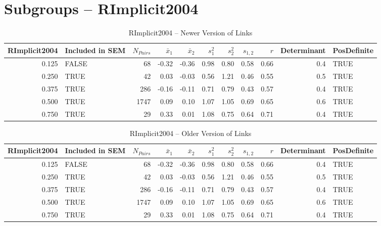 \documentclass{article}\usepackage[]{graphicx}\usepackage[]{color}
\begin{document}
\section{Subgroups --  RImplicit2004 }%
\begin{table}[ht]
\centering
\begin{tabular}{rlrrrrrrrrl}
  \hline
RImplicit2004 & Included in SEM & $N_{Pairs}$ & $\bar{x}_1$ & $\bar{x}_2$ & $s_1^2$ & $s_2^2$ & $s_{1,2}$ & $r$ & Determinant & PosDefinite \\ 
  \hline
0.125 & FALSE & 68 & -0.32 & -0.36 & 0.98 & 0.80 & 0.58 & 0.66 & 0.4 & TRUE \\ 
  0.250 & TRUE & 42 & 0.03 & -0.03 & 0.56 & 1.21 & 0.46 & 0.55 & 0.5 & TRUE \\ 
  0.375 & TRUE & 286 & -0.16 & -0.11 & 0.71 & 0.79 & 0.43 & 0.57 & 0.4 & TRUE \\ 
  0.500 & TRUE & 1747 & 0.09 & 0.10 & 1.07 & 1.05 & 0.69 & 0.65 & 0.6 & TRUE \\ 
  0.750 & TRUE & 29 & 0.33 & 0.01 & 1.08 & 0.75 & 0.64 & 0.71 & 0.4 & TRUE \\ 
   \hline
\end{tabular}
\caption{RImplicit2004 -- Newer Version of Links} 
\end{table}
\begin{table}[ht]
\centering
\begin{tabular}{rlrrrrrrrrl}
  \hline
RImplicit2004 & Included in SEM & $N_{Pairs}$ & $\bar{x}_1$ & $\bar{x}_2$ & $s_1^2$ & $s_2^2$ & $s_{1,2}$ & $r$ & Determinant & PosDefinite \\ 
  \hline
0.125 & FALSE & 68 & -0.32 & -0.36 & 0.98 & 0.80 & 0.58 & 0.66 & 0.4 & TRUE \\ 
  0.250 & TRUE & 42 & 0.03 & -0.03 & 0.56 & 1.21 & 0.46 & 0.55 & 0.5 & TRUE \\ 
  0.375 & TRUE & 286 & -0.16 & -0.11 & 0.71 & 0.79 & 0.43 & 0.57 & 0.4 & TRUE \\ 
  0.500 & TRUE & 1747 & 0.09 & 0.10 & 1.07 & 1.05 & 0.69 & 0.65 & 0.6 & TRUE \\ 
  0.750 & TRUE & 29 & 0.33 & 0.01 & 1.08 & 0.75 & 0.64 & 0.71 & 0.4 & TRUE \\ 
   \hline
\end{tabular}
\caption{RImplicit2004 -- Older Version of Links} 
\end{table}
\end{document}
